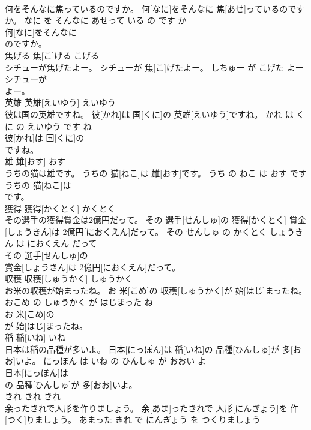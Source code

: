 \documentclass[8pt]{extreport}
\begin{document}
\begin{CJK}{UTF8}{min}
\\	何をそんなに焦っているのですか。	何[なに]をそんなに 焦[あせ]っているのですか。	なに を そんなに あせって いる の です か	
\\	何[なに]をそんなに
\\	のですか。			
\\	焦げる	焦[こ]げる	こげる	
\\	シチューが焦げたよー。	シチューが 焦[こ]げたよー。	しちゅー が こげた よー	
\\	シチューが
\\	よー。			
\\	英雄	英雄[えいゆう]	えいゆう	
\\	彼は国の英雄ですね。	彼[かれ]は 国[くに]の 英雄[えいゆう]ですね。	かれ は くに の えいゆう です ね	
\\	彼[かれ]は 国[くに]の
\\	ですね。			
\\	雄	雄[おす]	おす	
\\	うちの猫は雄です。	うちの 猫[ねこ]は 雄[おす]です。	うち の ねこ は おす です	
\\	うちの 猫[ねこ]は
\\	です。			
\\	獲得	獲得[かくとく]	かくとく	
\\	その選手の獲得賞金は2億円だって。	その 選手[せんしゅ]の 獲得[かくとく] 賞金[しょうきん]は 2億円[におくえん]だって。	その せんしゅ の かくとく しょうきん は におくえん だって	
\\	その 選手[せんしゅ]の
\\	賞金[しょうきん]は 2億円[におくえん]だって。			
\\	収穫	収穫[しゅうかく]	しゅうかく	
\\	お米の収穫が始まったね。	お 米[こめ]の 収穫[しゅうかく]が 始[はじ]まったね。	おこめ の しゅうかく が はじまった ね	
\\	お 米[こめ]の
\\	が 始[はじ]まったね。			
\\	稲	稲[いね]	いね	
\\	日本は稲の品種が多いよ。	日本[にっぽん]は 稲[いね]の 品種[ひんしゅ]が 多[おお]いよ。	にっぽん は いね の ひんしゅ が おおい よ	
\\	日本[にっぽん]は
\\	の 品種[ひんしゅ]が 多[おお]いよ。			
\\	きれ	きれ	きれ	
\\	余ったきれで人形を作りましょう。	余[あま]ったきれで 人形[にんぎょう]を 作[つく]りましょう。	あまった きれ で にんぎょう を つくりましょう	

\end{CJK}
\end{document}
